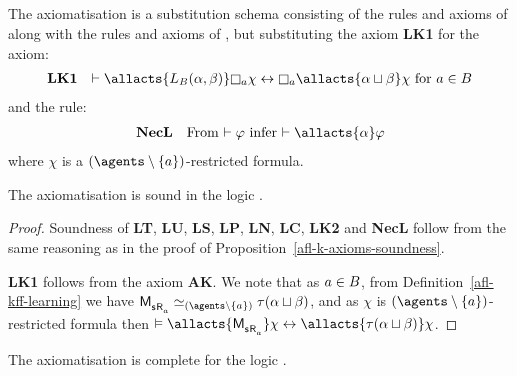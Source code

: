 \subsection{\classKFF{}}

\begin{definition}\label{afl-kff-axioms}
The axiomatisation \axiomAflKFF{} is a substitution schema consisting of the rules and axioms of \axiomKFF{} along with the rules and axioms of \axiomAflK{}, but substituting the \axiomAflK{} axiom {\bf LK1} for the axiom:
$$
\begin{array}{rl}
    {\bf LK1} & \proves \allacts{\learns_\agentsB (\alpha, \beta)} \necessary[\agentA] \chi \iff \necessary[\agentA] \allacts{\alpha \choice \beta} \chi \text{ for } \agentA \in \agentsB\\
\end{array}
$$
and the rule:
$$
\begin{array}{rl}
    {\bf NecL} & \text{From $\proves \phi$ infer $\proves \allacts{\alpha} \phi$}
\end{array}
$$
where $\chi$ is a $(\agents \setminus \{\agentA\})$-restricted formula.
\end{definition}

\begin{proposition}\label{afl-kff-axioms-soundness}
The axiomatisation \axiomAflKFF{} is sound in the logic \logicAmlKFF{}.
\end{proposition}

\begin{proof}
Soundness of {\bf LT}, {\bf LU}, {\bf LS}, {\bf LP}, {\bf LN}, {\bf LC}, {\bf LK2} and {\bf NecL} follow from the same reasoning as in the proof of Proposition~\ref{afl-k-axioms-soundness}.

{\bf LK1} follows from the \axiomAmlKFF{} axiom {\bf AK}.
We note that as $a \in B$, from Definition~\ref{afl-kff-learning} we have $\aPModel{\aStateS \aAccessibility{\agentA}} \bisimilar[(\agents \setminus \{\agentA\})] \tau(\alpha \choice \beta)$, and as $\chi$ is $(\agents \setminus \{\agentA\})$-restricted formula then $\entails \allacts{\aPModel{\aStateS \aAccessibility{\agentA}}} \chi \iff \allacts{\tau(\alpha \choice \beta)} \chi$.
\end{proof}

\begin{proposition}\label{afl-kff-axioms-completeness}
The axiomatisation \axiomAflKFF{} is complete for the logic \logicAmlKFF{}.
\end{proposition}


